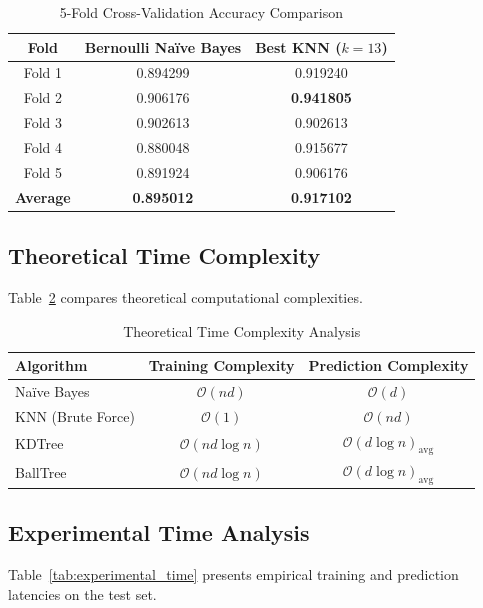 \documentclass[12pt,a4paper]{article}
\begin{document}
\begin{table}[H]
\centering
\caption{5-Fold Cross-Validation Accuracy Comparison} \label{tab:cv_results}
\vspace{0.2cm}
\begin{tabular}{ccc}
\toprule
\textbf{Fold} & \textbf{Bernoulli Na\"ive Bayes} & \textbf{Best KNN ($k=13$)} \\
\midrule
Fold 1 & 0.894299 & 0.919240 \\
Fold 2 & 0.906176 & \textbf{0.941805} \\
Fold 3 & 0.902613 & 0.902613 \\
Fold 4 & 0.880048 & 0.915677 \\
Fold 5 & 0.891924 & 0.906176 \\
\midrule
\textbf{Average} & \textbf{0.895012} & \textbf{0.917102} \\
\bottomrule
\end{tabular}
\end{table}

\subsection{Theoretical Time Complexity}
Table~\ref{tab:theoretical_complexity} compares theoretical computational complexities.

\begin{table}[H]
\centering
\caption{Theoretical Time Complexity Analysis} \label{tab:theoretical_complexity}
\vspace{0.2cm}
\begin{tabular}{lcc}
\toprule
\textbf{Algorithm} & \textbf{Training Complexity} & \textbf{Prediction Complexity} \\
\midrule
Na\"ive Bayes & $\mathcal{O}(nd)$ & $\mathcal{O}(d)$ \\
KNN (Brute Force) & $\mathcal{O}(1)$ & $\mathcal{O}(nd)$ \\
KDTree & $\mathcal{O}(nd \log n)$ & $\mathcal{O}(d \log n)_{\text{avg}}$ \\
BallTree & $\mathcal{O}(nd \log n)$ & $\mathcal{O}(d \log n)_{\text{avg}}$ \\
\bottomrule
\end{tabular}
\end{table}

\subsection{Experimental Time Analysis}
Table~\ref{tab:experimental_time} presents empirical training and prediction latencies on the test set.
\end{document}
